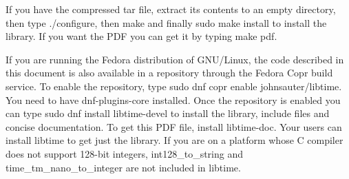 \documentclass[letterpaper,twoside]{article}
\begin{document}
If you have the compressed tar file, extract its contents to an empty
directory, then type {\ttfamily ./configure},
then {\ttfamily make} and finally {\ttfamily sudo make install} to
install the library.  If you want the PDF you can get it by
typing {\ttfamily make pdf}.

If you are running the Fedora distribution of GNU/Linux, the code
described in this document is also available in a repository
through the Fedora Copr build service.  To enable the repository,
type {\ttfamily sudo dnf copr enable johnsauter/libtime}.
You need to have dnf-plugins-core installed.
Once the repository is enabled you can type
{\ttfamily sudo dnf install libtime-devel} to install
the library, include files and concise documentation.
To get this PDF file, install {\ttfamily libtime-doc}.
Your users can install {\ttfamily libtime} to get just
the library.  If you are on a platform whose C compiler does
not support 128-bit integers, {\ttfamily int128\_to\_string}
and {\ttfamily time\_tm\_nano\_to\_integer} are not included
in libtime.
\end{document}
